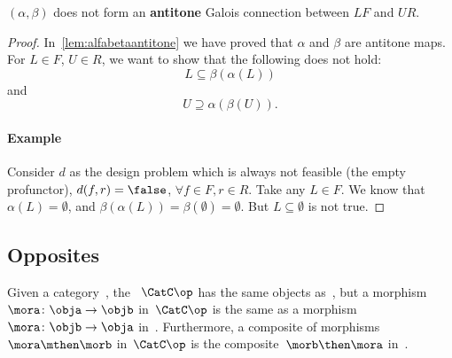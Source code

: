 

\begin{lemma}
  $(\alpha, \beta)$ does not form an \textbf{antitone} Galois connection between $LF$ and $UR$.
\end{lemma}
\begin{proof}
  In~\cref{lem:alfabetaantitone} we have proved that $\alpha$ and $\beta$ are antitone maps. For $L\in F$, $U\in R$, we want to show that the following does not hold:
  \begin{equation}
    \label{eq:alfabetafirst}
    L\subseteq \beta(\alpha(L))
  \end{equation}
  and
  \begin{equation}
    \label{eq:alfabetasec}
    U\supseteq \alpha(\beta(U)).
  \end{equation}

  \paragraph{Example} Consider $d$ as the design problem which is always not feasible (the empty profunctor), \ie  $d(f,r)=\false$, $\forall f\in F,r\in R$. Take any $L\in F$. We know that $\alpha(L)=\emptyset$, and $\beta(\alpha(L))=\beta(\emptyset)=\emptyset$. But $L\subseteq \emptyset$ is not true.

\end{proof}

\subsection{Opposites}

\begin{ctdefinition}
  \label{def:oppositecat}
  Given a category~\CatC, the \emph{}~$\CatC\op$ has the same objects as~\CatC, but a morphism~$\mora\colon \obja\to \objb$ in~$\CatC\op$ is the same as a morphism~$\mora\colon \objb\to \obja$ in~\CatC. Furthermore, a composite of morphisms~$\mora \mthen \morb$ in~$\CatC\op$ is the composite~$\morb\then \mora$ in~\CatC.
\end{ctdefinition}

